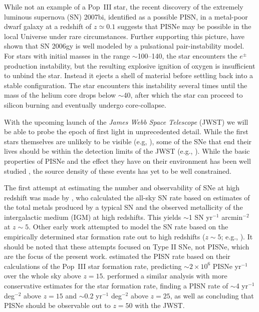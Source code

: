 \documentclass[../thesis.tex]{subfiles}
\begin{document}
While not an example of a Pop~III star, the recent discovery of the
extremely luminous supernova (SN) 2007bi, identified as a possible
PISN, in a metal-poor dwarf galaxy at a redshift of $z\simeq0.1$
\citep{Gal-Yametal2009} suggests that PISNe may be possible in the
local Universe under rare circumstances. Further supporting this
picture, \citet{WoosleyBlinnikovHeger2007} have shown that SN 2006gy
\citep{Smithetal2007} is well modeled by a pulsational
pair-instability model. For stars with initial masses in the range
$\sim$100--140\msun, the star encounters the $e^{\pm}$ production
instability, but the resulting explosive ignition of oxygen is
insufficient to unbind the star.  Instead it ejects a shell of
material before settling back into a stable configuration.  The star
encounters this instability several times until the mass of the helium
core drops below $\sim$40\msun, after which the star can proceed to
silicon burning and eventually undergo core-collapse.

With the upcoming launch of the \textit{James Webb Space Telescope}
(JWST) we will be able to probe the epoch of first light in
unprecedented detail.  While the first stars themselves are unlikely
to be visible (e.g, \citealt{BrommKudritzkiLoeb2001,
  PawlikMilosavljevicBromm2011}), some of the SNe that end their lives
should be within the detection limits of the JWST (e.g.,
\citealt{MackeyBrommHernquist2003, Scannapiecoetal2005,
  Gardneretal2006}). While the basic properties of PISNe and the
effect they have on their environment has been well studied
\citep{MoriFerraraMadau2002, BrommYoshidaHernquist2003,
  FurlanettoLoeb2003, KitayamaYoshida2005, Whalenetal2008,
  WiseAbel2008, Greifetal2010}, the source density of these events has
yet to be well constrained.

The first attempt at estimating the number and observability of SNe at
high redshift was made by \citet{Miralda-EscudeRees1997}, who
calculated the all-sky SN rate based on estimates of the total metals
produced by a typical SN and the observed metallicity of the
intergalactic medium (IGM) at high redshifts.  This yields $\sim$1 SN
yr$^{-1}$ arcmin$^{-2}$ at $z \sim 5$. Other early work attempted to
model the SN rate based on the empirically determined star formation
rate out to high redshifts ($z \sim 5$; e.g.,
\citealt{MadauDellaVallePanagia1998, DahlenFransson1999}).  It should
be noted that these attempts focused on Type II SNe, not PISNe, which
are the focus of the present work. \citet{MackeyBrommHernquist2003}
estimated the PISN rate based on their calculations of the Pop~III
star formation rate, predicting $\sim$$2\times10^6$ PISNe yr$^{-1}$
over the whole sky above $z=15$.  \citet{WeinmannLilly2005} performed
a similar analysis with more conservative estimates for the star
formation rate, finding a PISN rate of $\sim$4 yr$^{-1}$ deg$^{-2}$
above $z=15$ and $\sim$0.2 yr$^{-1}$ deg$^{-2}$ above $z=25$, as well
as concluding that PISNe should be observable out to $z=50$ with the
JWST.
\end{document}
